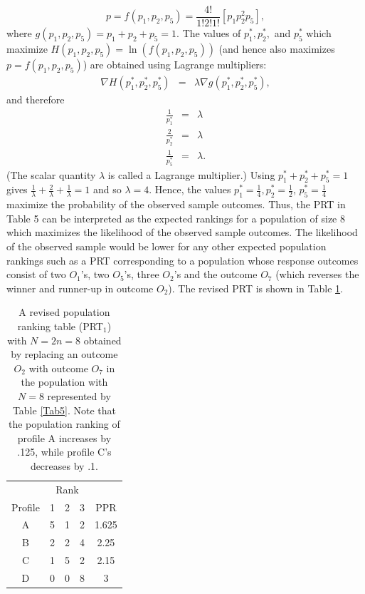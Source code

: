 \documentclass[a4paper, 12pt]{article}
\begin{document}
\begin{equation}
p=f(p_1,p_2,p_5)=\frac{4!}{1!2!1!}[p_1p_2^2p_5],
\end{equation}
\label{eq:1}
{\flushleft where} $g(p_1,p_2,p_5)=p_1+p_2+p_5=1$.
The values of $p_1^*,p_2^*,$ and $p_5^*$ which maximize $H(p_1,p_2,p_5)=\ln (f(p_1,p_2,p_5))$ (and hence also maximizes $p=f(p_1,p_2,p_5)$)  are obtained using Lagrange multipliers:
\begin{eqnarray*}
\nabla H(p_1^*,p_2^*,p_5^*) & = & \lambda \nabla g 
(p_1^*,p_2^*,p_5^*),
\end{eqnarray*}
{\flushleft and therefore}
\begin{eqnarray*}
\frac{1}{p_1^*} & = & \lambda\\
\frac{2}{p_2^*} & = & \lambda\\
\frac{1}{p_5^*} & = & \lambda.
\end{eqnarray*}
{\flushleft (The scalar quantity $\lambda$ is called a Lagrange multiplier.) Using} $p_1^*+p_2^*+p_5^*=1$ gives $\frac{1}{\lambda} + \frac{2}{\lambda}+\frac{1}{\lambda}=1$ and so $ \lambda = 4$.  Hence, the values $p_1^*=\frac{1}{4}, p_2^*=\frac{1}{2}$, $p_5^*=\frac{1}{4}$ maximize the probability of the observed sample outcomes.  Thus, the PRT in Table 5 can be interpreted as the expected rankings for a population of size 8 which maximizes the likelihood of the observed sample outcomes.  The likelihood of the observed sample would be lower for any other expected population rankings such as a PRT corresponding to a population whose response outcomes  consist of two $O_1$'s, two $O_5$'s, three $O_2$'s and the outcome $O_7$ (which reverses the winner and runner-up in outcome $O_2$).  The revised PRT is shown in Table \ref{Tab6}. 
\begin{table}[!htpb]
\centering
\scriptsize
\begin{tabular}{c|ccc|c}
&\multicolumn{3}{c}{Rank}&\\
Profile& 1 & 2 & 3&PPR\\\hline
A& 5&1&2&1.625\\
B& 2 &2&4 &2.25\\
C& 1 &5&2&2.15 \\
D& 0 &0&8&3 \\
\end{tabular}
\caption{{\small A revised population ranking table (PRT$_1$) with $N=2n=8$ obtained by replacing an outcome $O_2$ with outcome $O_7$ in the population with $N=8$ represented by Table \ref{Tab5}. Note that the population ranking of profile A increases by .125, while profile C's decreases by .1.}}
\label{Tab6}
\end{table}
\end{document}
